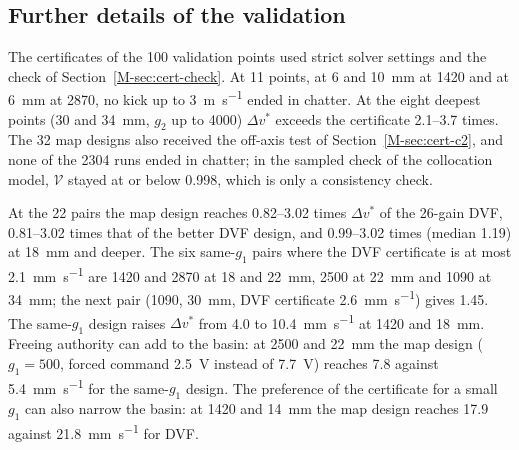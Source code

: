 \subsection{Further details of the validation}\label{supp:delayed-valid}

The certificates of the 100 validation points used strict solver settings and the check of Section~\ref{M-sec:cert-check}. At 11 points, at 6 and \SI{10}{\milli\metre} at \SI{1420}{\rpm} and at \SI{6}{\milli\metre} at \SI{2870}{\rpm}, no kick up to \SI{3}{\metre\per\second} ended in chatter. At the eight deepest points (30 and \SI{34}{\milli\metre}, $g_2$ up to 4000) $\Delta v^*$ exceeds the certificate 2.1--3.7 times. The 32 map designs also received the off-axis test of Section~\ref{M-sec:cert-c2}, and none of the 2304 runs ended in chatter; in the sampled check of the collocation model, $\mathcal V$ stayed at or below 0.998, which is only a consistency check.

At the 22 pairs the map design reaches 0.82--3.02 times $\Delta v^*$ of the 26-gain DVF, 0.81--3.02 times that of the better DVF design, and 0.99--3.02 times (median 1.19) at \SI{18}{\milli\metre} and deeper. The six same-$g_1$ pairs where the DVF certificate is at most \SI{2.1}{\milli\metre\per\second} are 1420 and \SI{2870}{\rpm} at 18 and \SI{22}{\milli\metre}, \SI{2500}{\rpm} at \SI{22}{\milli\metre} and \SI{1090}{\rpm} at \SI{34}{\milli\metre}; the next pair (\SI{1090}{\rpm}, \SI{30}{\milli\metre}, DVF certificate \SI{2.6}{\milli\metre\per\second}) gives 1.45. The same-$g_1$ design raises $\Delta v^*$ from 4.0 to \SI{10.4}{\milli\metre\per\second} at \SI{1420}{\rpm} and \SI{18}{\milli\metre}. Freeing authority can add to the basin: at \SI{2500}{\rpm} and \SI{22}{\milli\metre} the map design ($g_1=500$, forced command \SI{2.5}{\volt} instead of \SI{7.7}{\volt}) reaches 7.8 against \SI{5.4}{\milli\metre\per\second} for the same-$g_1$ design. The preference of the certificate for a small $g_1$ can also narrow the basin: at \SI{1420}{\rpm} and \SI{14}{\milli\metre} the map design reaches 17.9 against \SI{21.8}{\milli\metre\per\second} for DVF.

